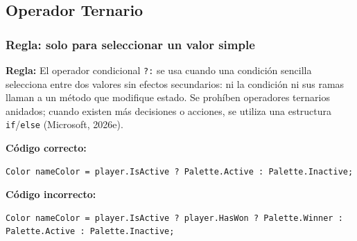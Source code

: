 \subsection{Operador Ternario}

\subsubsection{Regla: solo para seleccionar un valor simple}

\textbf{Regla:} El operador condicional \texttt{?:} se usa cuando una condición sencilla selecciona entre dos valores sin efectos secundarios: ni la condición ni sus ramas llaman a un método que modifique estado. Se prohíben operadores ternarios anidados; cuando existen más decisiones o acciones, se utiliza una estructura \texttt{if}/\texttt{else} (Microsoft, 2026e).

\textbf{Código correcto:}
\begin{lstlisting}[style=csharpstyle]
Color nameColor = player.IsActive ? Palette.Active : Palette.Inactive;
\end{lstlisting}

\textbf{Código incorrecto:}
\begin{lstlisting}[style=csharpstyle]
Color nameColor = player.IsActive ? player.HasWon ? Palette.Winner : Palette.Active : Palette.Inactive;
\end{lstlisting}
